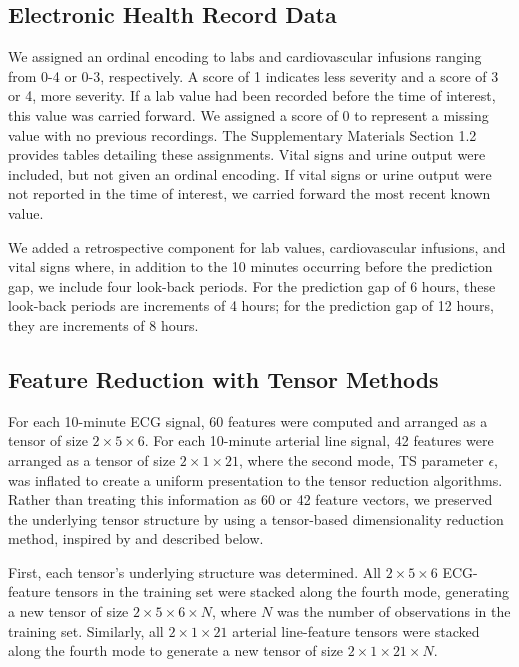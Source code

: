 \subsection*{Electronic Health Record Data} \label{sec:methods_ehr}
We assigned an ordinal encoding to labs and cardiovascular infusions ranging from 0-4 or 0-3, respectively. A score of 1 indicates less severity and a score of 3 or 4, more severity. If a lab value had been recorded before the time of interest, this value was carried forward. We assigned a score of 0 to represent a missing value with no previous recordings. The Supplementary Materials Section 1.2 provides tables detailing these assignments. Vital signs and urine output were included, but not given an ordinal encoding. If vital signs or urine output were not reported in the time of interest, we carried forward the most recent known value.

We added a retrospective component for lab values, cardiovascular infusions, and vital signs where, in addition to the 10 minutes occurring before the prediction gap, we include four look-back periods. For the prediction gap of 6 hours, these look-back periods are increments of 4 hours; for the prediction gap of 12 hours, they are increments of 8 hours.

\subsection*{Feature Reduction with Tensor Methods} \label{sec:methods_tensor}

For each 10-minute ECG signal, 60 features were computed and arranged as a tensor of size $2\times5\times6$. For each 10-minute arterial line signal, 42 features were arranged as a tensor of size $2\times1\times21$, where the second mode, TS parameter $\epsilon$, was inflated to create a uniform presentation to the tensor reduction algorithms. Rather than treating this information as 60 or 42 feature vectors, we preserved the underlying tensor structure by using a tensor-based dimensionality reduction method, inspired by \cite{hernandez_multimodal_2021} and described below.

First, each tensor's underlying structure was determined. All $2 \times 5 \times 6$ ECG-feature tensors in the training set were stacked along the fourth mode, generating a new tensor of size $2 \times 5 \times 6 \times N$, where $N$ was the number of observations in the training set. Similarly, all $2 \times 1 \times 21$ arterial line-feature tensors were stacked along the fourth mode to generate a new tensor of size $2 \times 1 \times 21 \times N$.

